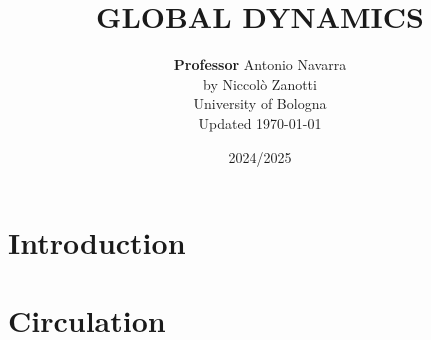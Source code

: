 \documentclass[
    11pt, %
    english, %
    oneside
]{book} %
\def\notetitle{GLOBAL DYNAMICS}
\def\noteauthor{
    \textbf{Professor} Antonio Navarra \\
    by Niccolò Zanotti\\
    University of Bologna\\
    Updated \today}
\def\notedate{2024/2025}
\begin{document}
    \title{\textbf{
        \LARGE{\notetitle} \vspace*{10\baselineskip}}
    }
    \author{\noteauthor}
    \date{\notedate}

    \maketitle
    \newpage

    \tableofcontents
    \newpage


\chapter{Introduction}

    

\chapter{Circulation}

    
%
%
%
%
%
%
%
%
%
%
%
%
%


% 

    \printbibliography
\end{document}
